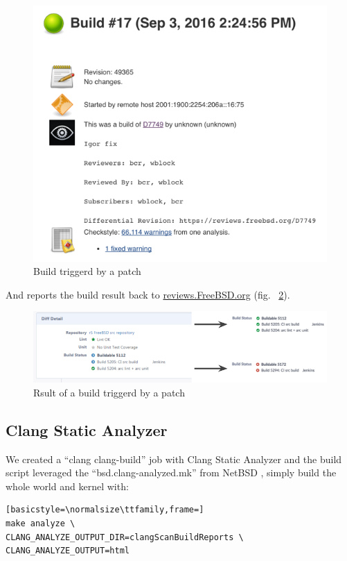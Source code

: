 \documentclass[a4paper,twocolumn,10pt]{article}
\begin{document}
\begin{figure}
\includegraphics{build-patch.png}
\caption{Build triggerd by a patch}
\label{build-patch}
\end{figure}

And reports the build result back to \url{reviews.FreeBSD.org} (fig.
~\ref{patch-build-result}).

\begin{figure}
\includegraphics[width=\textwidth]{patch-build-result.png}
\caption{Rsult of a build triggerd by a patch}
\label{patch-build-result}
\end{figure}

\subsection{Clang Static Analyzer}

We created a ``clang clang-build'' job with Clang Static Analyzer
\cite{clang-static-analyzer} and the build script leveraged the
``bsd.clang-analyzed.mk'' from NetBSD \cite{netbsd}, simply build the whole
world and kernel with:

\begin{lstlisting}[basicstyle=\normalsize\ttfamily,frame=]
make analyze \
CLANG_ANALYZE_OUTPUT_DIR=clangScanBuildReports \
CLANG_ANALYZE_OUTPUT=html
\end{lstlisting}
\end{document}
